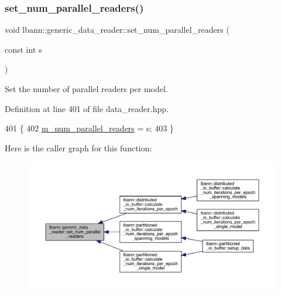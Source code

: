 \subsubsection{\texorpdfstring{set\+\_\+num\+\_\+parallel\+\_\+readers()}{set\_num\_parallel\_readers()}}
{\footnotesize\ttfamily void lbann\+::generic\+\_\+data\+\_\+reader\+::set\+\_\+num\+\_\+parallel\+\_\+readers (\begin{DoxyParamCaption}\item[{const int}]{s }\end{DoxyParamCaption})\hspace{0.3cm}{\ttfamily [inline]}}



Set the number of parallel readers per model. 



Definition at line 401 of file data\+\_\+reader.\+hpp.


\begin{DoxyCode}
401                                              \{
402     \hyperlink{classlbann_1_1generic__data__reader_a6eb9b8c7c704374a1e49dce87110455e}{m\_num\_parallel\_readers} = s;
403   \}
\end{DoxyCode}
Here is the caller graph for this function\+:\nopagebreak
\begin{figure}[H]
\begin{center}
\leavevmode
\includegraphics[width=350pt]{classlbann_1_1generic__data__reader_a9b348d52852062dbc66b0accde5c6e8a_icgraph}
\end{center}
\end{figure}
\mbox{\label{classlbann_1_1generic__data__reader_a8515fb4ffbeaa89fd8459b66b9ba358f}} 
